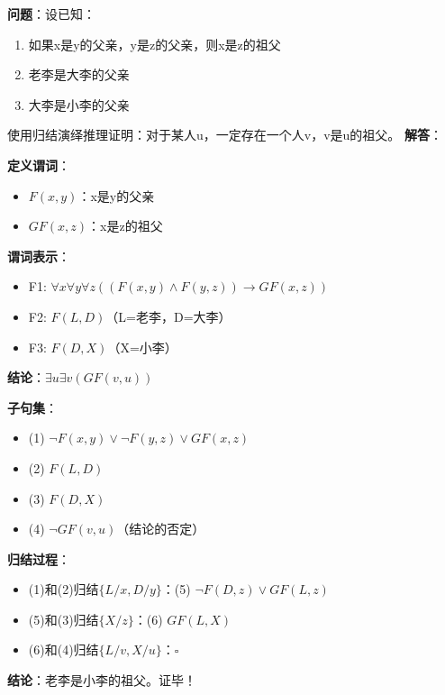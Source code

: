 \begin{examplebox}
\textbf{问题}：设已知：
\begin{enumerate}[itemsep=0pt]
    \item 如果x是y的父亲，y是z的父亲，则x是z的祖父
    \item 老李是大李的父亲
    \item 大李是小李的父亲
\end{enumerate}
使用归结演绎推理证明：对于某人u，一定存在一个人v，v是u的祖父。
\tcblower
\textbf{解答}：

\textbf{定义谓词}：
\begin{itemize}[itemsep=0pt]
    \item $F(x,y)$：x是y的父亲
    \item $GF(x,z)$：x是z的祖父
\end{itemize}

\textbf{谓词表示}：
\begin{itemize}[itemsep=0pt]
    \item F1: $\forall x \forall y \forall z((F(x,y) \land F(y,z)) \to GF(x,z))$
    \item F2: $F(L,D)$（L=老李，D=大李）
    \item F3: $F(D,X)$（X=小李）
\end{itemize}

\textbf{结论}：$\exists u \exists v(GF(v,u))$

\textbf{子句集}：
\begin{itemize}[itemsep=0pt]
    \item (1) $\neg F(x,y) \lor \neg F(y,z) \lor GF(x,z)$
    \item (2) $F(L,D)$
    \item (3) $F(D,X)$
    \item (4) $\neg GF(v,u)$（结论的否定）
\end{itemize}

\textbf{归结过程}：
\begin{itemize}[itemsep=0pt]
    \item (1)和(2)归结$\{L/x, D/y\}$：(5) $\neg F(D,z) \lor GF(L,z)$
    \item (5)和(3)归结$\{X/z\}$：(6) $GF(L,X)$
    \item (6)和(4)归结$\{L/v, X/u\}$：$\square$
\end{itemize}

\textbf{结论}：老李是小李的祖父。证毕！
\end{examplebox}


